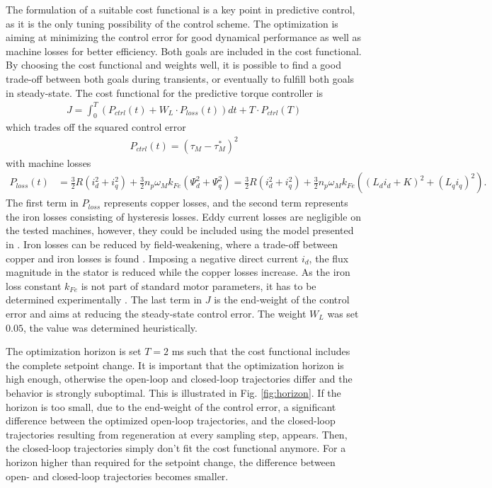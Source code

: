 \documentclass[a4paper,11pt,fleqn]{article}
\begin{document}
The formulation of a suitable cost functional is a key point in predictive control, as it is the only tuning possibility of the control scheme. The optimization is aiming at minimizing the control error for good dynamical performance as well as machine losses for better efficiency. Both goals are included in the cost functional. By choosing the cost functional and weights well, it is possible to find a good trade-off between both goals during transients, or eventually to fulfill both goals in steady-state. The cost functional for the predictive torque controller is
\begin{align}
 J = \int_0^T \left( P_{ctrl}(t) + W_L \cdot P_{loss}(t) \right) dt + T \cdot P_{ctrl}(T) \label{eq:J}
\end{align}
which trades off the squared control error
\begin{align}
P_{ctrl}(t) = (\tau_M-\tau_M^*)^2
\end{align}
with machine losses 
\begin{align}
P_{loss}(t) &= \frac{3}{2}R(i_d^2+i_q^2) +\frac{3}{2} n_p\omega_M k_{Fe} (\Psi_d^2+\Psi_q^2) = \frac{3}{2}R(i_d^2+i_q^2) +\frac{3}{2} n_p\omega_M k_{Fe} ((L_d i_d+K)^2+ (L_q i_q)^2)   .
\end{align}
The first term in $P_{loss}$ represents copper losses, and the second term represents the iron losses consisting of hysteresis losses. Eddy current losses are negligible on the tested machines, however, they could be included using the model presented in \cite{Eisenmodell}. Iron losses can be reduced by field-weakening, where a trade-off between copper and iron losses is found \cite{PMSMeff}. Imposing a negative direct current $i_d$, the flux magnitude in the stator is reduced while the copper losses increase. As the iron loss constant $k_{Fe}$ is not part of standard motor parameters, it has to be determined experimentally \cite{Eisenverlust}. The last term in $J$ is the end-weight of the control error and aims at reducing the steady-state control error. The weight $W_L$ was set $0.05$, the value was determined heuristically.

The optimization horizon is set $T=2$ ms such that the cost functional includes the complete setpoint change. It is important that the optimization horizon is high enough, otherwise the open-loop and closed-loop trajectories differ and the behavior is strongly suboptimal. This is illustrated in Fig. \ref{fig:horizon}. If the horizon is too small, due to the end-weight of the control error, a significant difference between the optimized open-loop trajectories, and the closed-loop trajectories resulting from regeneration at every sampling step, appears. Then, the closed-loop trajectories simply don't fit the cost functional anymore. For a horizon higher than required for the setpoint change, the difference between open- and closed-loop trajectories becomes smaller.
\end{document}
